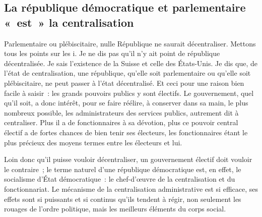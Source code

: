 \documentclass[french,twoside]{book} %
\newcommand{\astermono}{\medskip\centerline{\color{rubric}\large\selectfont{\syms ✻}}\medskip\par}%
\begin{document}
\astermono

\subsection[{La république démocratique et parlementaire « est » la centralisation}]{La république démocratique et parlementaire « est » la centralisation}
\noindent Parlementaire ou plébiscitaire, nulle République ne saurait décentraliser. Mettons tous les points sur les i. Je ne dis pas qu’il n’y ait point de république décentralisée. Je sais l’existence de la Suisse et celle des États-Unis. Je dis que, de l’état de centralisation, une république, qu’elle soit parlementaire ou qu’elle soit plébiscitaire, ne peut passer à l’état décentralisé. Et ceci pour une raison bien facile à saisir : les grands pouvoirs publics y sont électifs. Le gouvernement, quel qu’il soit, a donc intérêt, pour se faire réélire, à conserver dans sa main, le plus nombreux possible, les administrateurs des services publics, autrement dit à centraliser. Plus il a de fonctionnaires à sa dévotion, plus ce pouvoir central électif a de fortes chances de bien tenir ses électeurs, les fonctionnaires étant le plus précieux des moyens termes entre les électeurs et lui.\par
Loin donc qu’il puisse vouloir décentraliser, un gouvernement électif doit vouloir le contraire ; le terme naturel d’une république démocratique est, en effet, le socialisme d’État démocratique : le chef-d’œuvre de la centralisation et du fonctionnariat. Le mécanisme de la centralisation administrative est si efficace, ses effets sont si puissants et si continus qu’ils tendent à régir, non seulement les rouages de l’ordre politique, mais les meilleurs éléments du corps social.\par

\astermono
\end{document}
